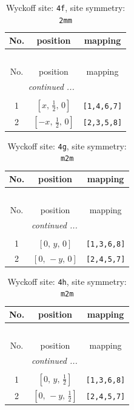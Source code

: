 \documentclass[fleqn,8pt]{jsarticle}
\begin{document}
\renewcommand{\arraystretch}{1.2}
\begin{longtable}{ccc}
\caption{Wyckoff site: {\tt 4f}, site symmetry: {\tt 2mm}}
 \\
 \hline \hline
No. & position & mapping \\ \hline \endfirsthead

\multicolumn{2}{l}{\tablename\ \thetable{}} \\
 \hline \hline
No. & position & mapping \\ \hline \endhead

 \hline \hline
\multicolumn{2}{r}{\footnotesize\it continued ...} \\ \endfoot

 \hline \hline
\multicolumn{2}{r}{} \\ \endlastfoot

1 & $\left[ x,\, \frac{1}{2},\, 0 \right]$ & {\tt [1,4,6,7]} \\ \hline
2 & $\left[ - x,\, \frac{1}{2},\, 0 \right]$ & {\tt [2,3,5,8]} \\
\end{longtable}
\renewcommand{\arraystretch}{1.2}
\begin{longtable}{ccc}
\caption{Wyckoff site: {\tt 4g}, site symmetry: {\tt m2m}}
 \\
 \hline \hline
No. & position & mapping \\ \hline \endfirsthead

\multicolumn{2}{l}{\tablename\ \thetable{}} \\
 \hline \hline
No. & position & mapping \\ \hline \endhead

 \hline \hline
\multicolumn{2}{r}{\footnotesize\it continued ...} \\ \endfoot

 \hline \hline
\multicolumn{2}{r}{} \\ \endlastfoot

1 & $\left[ 0,\, y,\, 0 \right]$ & {\tt [1,3,6,8]} \\ \hline
2 & $\left[ 0,\, - y,\, 0 \right]$ & {\tt [2,4,5,7]} \\
\end{longtable}
\renewcommand{\arraystretch}{1.2}
\begin{longtable}{ccc}
\caption{Wyckoff site: {\tt 4h}, site symmetry: {\tt m2m}}
 \\
 \hline \hline
No. & position & mapping \\ \hline \endfirsthead

\multicolumn{2}{l}{\tablename\ \thetable{}} \\
 \hline \hline
No. & position & mapping \\ \hline \endhead

 \hline \hline
\multicolumn{2}{r}{\footnotesize\it continued ...} \\ \endfoot

 \hline \hline
\multicolumn{2}{r}{} \\ \endlastfoot

1 & $\left[ 0,\, y,\, \frac{1}{2} \right]$ & {\tt [1,3,6,8]} \\ \hline
2 & $\left[ 0,\, - y,\, \frac{1}{2} \right]$ & {\tt [2,4,5,7]} \\
\end{longtable}
\end{document}
